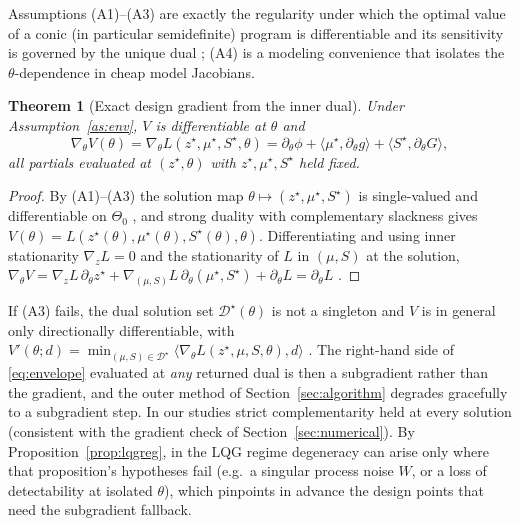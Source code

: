 \documentclass[twocolumn,amsthm]{autart}
\newtheorem{theorem}{Theorem}
\begin{document}
Assumptions (A1)--(A3) are exactly the regularity under which the optimal value
of a conic (in particular semidefinite) program is differentiable and its
sensitivity is governed by the unique dual
\cite{bonnans2000perturbation,shapiro1997differentiability}; (A4) is a modeling
convenience that isolates the $\theta$-dependence in cheap model Jacobians.

\begin{theorem}[Exact design gradient from the inner dual]\label{prop:envelope}
Under Assumption~\ref{as:env}, $V$ is differentiable at $\theta$ and
\begin{equation}\label{eq:envelope}
\nabla_\theta V(\theta) = \nabla_\theta L(z^\star,\mu^\star,S^\star,\theta)
= \partial_\theta \phi + \langle \mu^\star, \partial_\theta g\rangle
+ \langle S^\star, \partial_\theta G\rangle,
\end{equation}
all partials evaluated at $(z^\star,\theta)$ with $z^\star,\mu^\star,S^\star$
held fixed.
\end{theorem}
\begin{proof}
By (A1)--(A3) the solution map $\theta\mapsto(z^\star,\mu^\star,S^\star)$ is
single-valued and differentiable on $\Theta_0$
\cite{bonnans2000perturbation,shapiro1997differentiability}, and strong duality
with complementary slackness gives
$V(\theta) = L(z^\star(\theta),\mu^\star(\theta),S^\star(\theta),\theta)$.
Differentiating and using inner stationarity $\nabla_z L = 0$ and the
stationarity of $L$ in $(\mu,S)$ at the solution,
$\nabla_\theta V = \nabla_z L\,\partial_\theta z^\star
+ \nabla_{(\mu,S)}L\,\partial_\theta(\mu^\star,S^\star) + \partial_\theta L
= \partial_\theta L$ \cite{milgrom2002envelope,bonnans2000perturbation}.
\end{proof}

\begin{rem}\label{rem:degenerate}
If (A3) fails, the dual solution set $\mathcal{D}^\star(\theta)$ is not a
singleton and $V$ is in general only directionally differentiable, with
$V'(\theta;d) = \min_{(\mu,S)\in\mathcal{D}^\star}
\langle \nabla_\theta L(z^\star,\mu,S,\theta), d\rangle$
\cite{bonnans2000perturbation}. The right-hand side of \eqref{eq:envelope}
evaluated at \emph{any} returned dual is then a subgradient rather than the
gradient, and the outer method of Section~\ref{sec:algorithm} degrades
gracefully to a subgradient step. In our studies strict complementarity held at
every solution (consistent with the gradient check of
Section~\ref{sec:numerical}). By Proposition~\ref{prop:lqgreg}, in the
LQG regime degeneracy can arise only where that proposition's hypotheses fail
(e.g.\ a singular process noise $W$, or a loss of detectability at isolated
$\theta$), which pinpoints in advance the design points that need the subgradient
fallback.
\end{rem}
\end{document}
